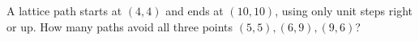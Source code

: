 A lattice path starts at $(4,4)$ and ends at $(10,10)$, using only unit steps right or up. How many paths avoid all three points $(5,5),(6,9),(9,6)$?
